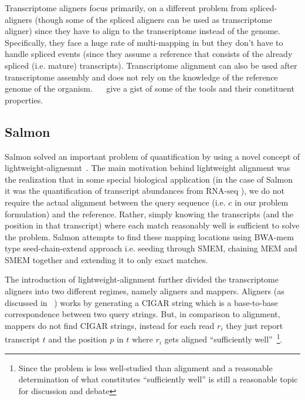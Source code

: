 Transcriptome aligners focus primarily, on a different problem from spliced-aligners (though some of the spliced aligners can be used as transcriptome aligner) since they have to align \reads to the transcriptome instead of the genome. Specifically, they face a huge rate of multi-mapping in \reads but they don't have to handle spliced events (since they assume a reference that consists of the already spliced (i.e. mature) transcripts). Transcriptome alignment can also be used after \denovo transcriptome assembly and does not rely on the knowledge of the reference genome of the organism. ~~\citep{li2010survey} give a gist of some of the tools and their constituent properties.

\subsection{Salmon~\citep{salmon}} \label{salmon}

Salmon solved an important problem of quantification by using a novel concept of lightweight-alignemnt~\citep{salmon}. The main motivation behind lightweight alignment was the realization that in some special biological application (in the case of Salmon it was the quantification of transcript abundances from RNA-seq \reads), we do not require the actual alignment between the query sequence (i.e. $c$ in our problem formulation) and the reference. Rather, simply knowing the transcripts (and the position in that transcript) where each match reasonably well is sufficient to solve the problem. Salmon attempts to find these mapping locations using BWA-mem type seed-chain-extend approach i.e. seeding through SMEM, chaining MEM and SMEM together and extending it to only exact matches.

The introduction of lightweight-alignment further divided the transcriptome aligners into two different regimes, namely aligners and mappers. Aligners (as discussed in ~) works by generating a CIGAR string which is a base-to-base correspondence between two query strings. But, in comparison to alignment, mappers do not find CIGAR strings, instead for each read $r_i$ they just report transcript $t$ and the position $p$ in $t$ where $r_i$ gets aligned “sufficiently well”~\citep{blog}\footnote{Since the problem is less well-studied than alignment and a reasonable determination of what constitutes “sufficiently well” is still a reasonable topic for discussion and debate}.

